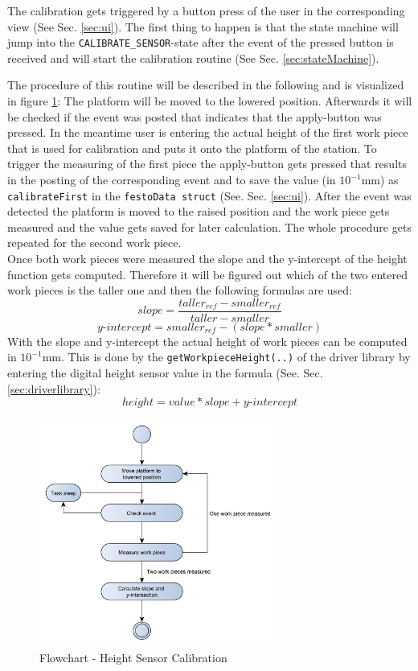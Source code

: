 The calibration gets triggered by a button press of the user in the corresponding view (See Sec. \ref{sec:ui}). The first thing to happen is that the state machine will jump into the \texttt{CALIBRATE\_SENSOR}-state after the event of the pressed button is received and will start the calibration routine (See Sec. \ref{sec:stateMachine}). 

The procedure of this routine will be described in the following and is visualized in figure \ref{fig:calibration}: 
The platform will be moved to the lowered position. Afterwards it will be checked if the event was posted that indicates that the apply-button was pressed. In the meantime user is entering the actual height of the first work piece that is used for calibration and puts it onto the platform of the station. To trigger the measuring of the first piece the apply-button gets pressed that results in the posting of the corresponding event and to save the value (in $10^{-1}$mm) as \texttt{calibrateFirst} in the \texttt{festoData struct} (See. Sec. \ref{sec:ui}). 
After the event was detected the platform is moved to the raised position and the work piece gets measured and the value gets saved for later calculation.
The whole procedure gets repeated for the second work piece. \\
Once both work pieces were measured the slope and the y-intercept of the height function gets computed. Therefore it will be figured out which of the two entered work pieces is the taller one and then the following formulas are used:
\[slope = \frac{taller_{ref} - smaller_{ref}}{taller - smaller}\]
\[y\text{-}intercept = smaller_{ref} - (slope * smaller)\]
With the slope and y-intercept the actual height of work pieces can be computed in $10^{-1}$mm. This is done by the \texttt{getWorkpieceHeight(..)} of the driver library by entering the digital height sensor value in the formula (See. Sec. \ref{sec:driverlibrary}):
\[height = value * slope + y\text{-}intercept\]

\begin{figure}[H]
	\begin{center}
		\includegraphics[width=0.7\textwidth]{media/Flow_Chart_Calibration.pdf} 	
		\caption{Flowchart - Height Sensor Calibration}
		\label{fig:calibration}
	\end{center}
\end{figure}

